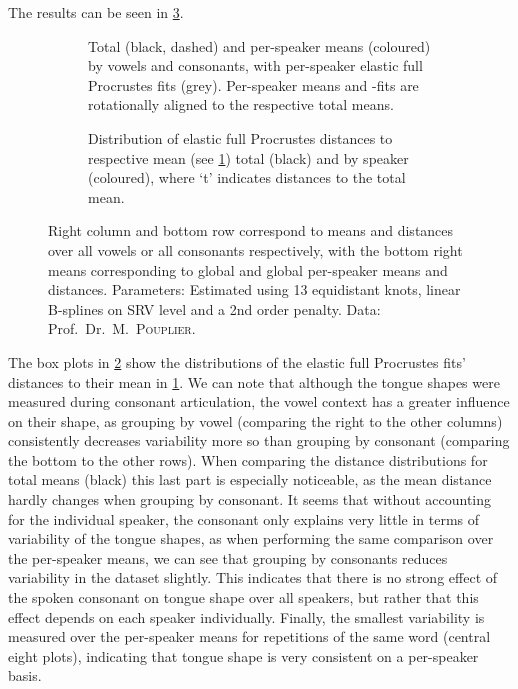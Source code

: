 The results can be seen in \cref{fig:4-tounges}.
\begin{figure}
  \centering
  \advance\leftskip-1cm
  \begin{subfigure}[t]{0.72\textwidth}
    \centering
    \centering
    \caption{Total (black, dashed) and per-speaker means (coloured) by vowels and consonants, with per-speaker elastic full Procrustes fits (grey). 
    Per-speaker means and -fits are rotationally aligned to the respective total means.}
    \label{fig:4-tongue-means}
  \end{subfigure}%
  \begin{subfigure}[t]{0.40\textwidth}
    \centering
    \centering
    \caption{Distribution of elastic full Procrustes distances to respective mean (see \cref{fig:4-tongue-means}) total (black) and by speaker (coloured), where \enquote*{t} indicates distances to the total mean.}
    \label{fig:4-tongue-dists}
  \end{subfigure}
  \caption{Right column and bottom row correspond to means and distances over all vowels or all consonants respectively, with the bottom right means corresponding to global and global per-speaker means and distances.
    Parameters: Estimated using 13 equidistant knots, linear B-splines on SRV level and a 2nd order penalty.
    Data: Prof.\ Dr.\ M.\ \textsc{Pouplier}.}
  \label{fig:4-tounges}
\end{figure}
The box plots in \cref{fig:4-tongue-dists} show the distributions of the elastic full Procrustes fits' distances to their  mean in \cref{fig:4-tongue-means}.
We can note that although the tongue shapes were measured during consonant articulation, the vowel context has a greater influence on their shape, as grouping by vowel (comparing the right to the other columns) consistently decreases variability more so than grouping by consonant (comparing the bottom to the other rows). 
When comparing the distance distributions for total means (black) this last part is especially noticeable, as the mean distance hardly changes when grouping by consonant.
It seems that without accounting for the individual speaker, the consonant only explains very little in terms of variability of the tongue shapes, as when performing the same comparison over the per-speaker means, we can see that grouping by consonants reduces variability in the dataset slightly.
This indicates that there is no strong effect of the spoken consonant on tongue shape over all speakers, but rather that this effect depends on each speaker individually.
Finally, the smallest variability is measured over the per-speaker means for repetitions of the same word (central eight plots), indicating that tongue shape is very consistent on a per-speaker basis.


